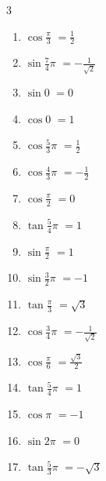 \begin{multicols}{3}
\begin{enumerate}
  \item $\displaystyle \cos{\frac{\pi}{3}}$
        $\displaystyle =\frac{1}{2}$

  \item $\displaystyle \sin{\frac{7}{4}\pi}$
        $\displaystyle =-\frac{1}{\sqrt{2}}$

  \item $\displaystyle \sin{0}$
        $\displaystyle =0$

  \item $\displaystyle \cos{0}$
        $\displaystyle =1$

  \item $\displaystyle \cos{\frac{5}{3}\pi}$
        $\displaystyle =\frac{1}{2}$

  \item $\displaystyle \cos{\frac{4}{3}\pi}$
        $\displaystyle =-\frac{1}{2}$

  \item $\displaystyle \cos{\frac{\pi}{2}}$
        $\displaystyle =0$

  \item $\displaystyle \tan{\frac{5}{4}\pi}$
        $\displaystyle =1$

  \item $\displaystyle \sin{\frac{\pi}{2}}$
        $\displaystyle =1$

  \item $\displaystyle \sin{\frac{3}{2}\pi}$
        $\displaystyle =-1$

  \item $\displaystyle \tan{\frac{\pi}{3}}$
        $\displaystyle =\sqrt{3}$

  \item $\displaystyle \cos{\frac{3}{4}\pi}$
        $\displaystyle =-\frac{1}{\sqrt{2}}$

  \item $\displaystyle \cos{\frac{\pi}{6}}$
        $\displaystyle =\frac{\sqrt{3}}{2}$

  \item $\displaystyle \tan{\frac{5}{4}\pi}$
        $\displaystyle =1$

  \item $\displaystyle \cos{\pi}$
        $\displaystyle =-1$

  \item $\displaystyle \sin{2\pi}$
        $\displaystyle =0$

  \item $\displaystyle \tan{\frac{5}{3}\pi}$
        $\displaystyle =-\sqrt{3}$


\end{enumerate}
\end{multicols}
